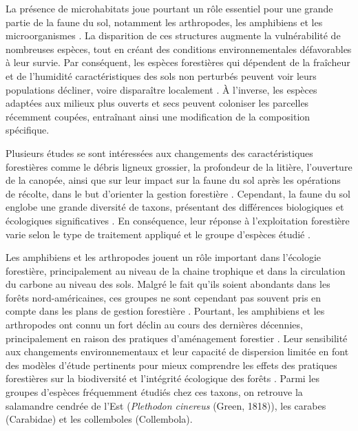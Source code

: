 La présence de microhabitats joue pourtant un rôle essentiel pour une grande partie de la faune du sol, notamment les arthropodes, les amphibiens et les microorganismes \citep{Paillet2010Biodiversitydifferences,Fedrowitz2014Canretention,Chaudhary2016Impactforest}. 
La disparition de ces structures augmente la vulnérabilité de nombreuses espèces, tout en créant des conditions environnementales défavorables à leur survie. 
Par conséquent, les espèces forestières qui dépendent de la fraîcheur et de l'humidité caractéristiques des sols non perturbés peuvent voir leurs populations décliner, voire disparaître localement \citep{Kudrin2023metaanalysiseffects}. 
À l'inverse, les espèces adaptées aux milieux plus ouverts et secs peuvent coloniser les parcelles récemment coupées, entraînant ainsi une modification de la composition spécifique. 

Plusieurs études se sont intéressées aux changements des caractéristiques forestières comme le débris ligneux grossier, la profondeur de la litière, l'ouverture de la canopée, 
ainsi que sur leur impact sur la faune du sol après les opérations de récolte, dans le but d'orienter la gestion forestière \citep{Semlitsch2002CriticalElements,McKenny2006Effectsstructural}. 
Cependant, la faune du sol englobe une grande diversité de taxons, présentant des différences biologiques et écologiques significatives \citep{Kudrin2023metaanalysiseffects}. 
En conséquence, leur réponse à l'exploitation forestière varie selon le type de traitement appliqué et le groupe d'espèces étudié \citep{Malmstrom2009Dynamicssoil,Paillet2010Biodiversitydifferences}. 

Les amphibiens et les arthropodes jouent un rôle important dans l'écologie forestière, principalement au niveau de la chaine trophique et dans la circulation du carbone au niveau des sols. 
Malgré le fait qu'ils soient abondants dans les forêts nord-américaines, ces groupes ne sont cependant pas souvent pris en compte dans les plans de gestion forestière \citep{deMaynadier1995relationshipforest}. 
Pourtant, les amphibiens et les arthropodes ont connu un fort déclin au cours des dernières décennies, principalement en raison des pratiques d'aménagement forestier \citep{Houlahan2000Quantitativeevidence,Stuart2004Statustrends,Wagner2021Insectdecline}. 
Leur sensibilité aux changements environnementaux et leur capacité de dispersion limitée en font des modèles d'étude pertinents pour mieux comprendre les effets des pratiques forestières 
sur la biodiversité et l'intégrité écologique des forêts \citep{pongeVerticalDistributionCollembola2000,Ojala2001Dispersalmicroarthropods,birdChangesSoilLitter2004,Maleque2009Arthropodsbioindicators}. 
Parmi les groupes d'espèces fréquemment étudiés chez ces taxons, on retrouve la salamandre cendrée de l'Est (\textit{Plethodon cinereus} (Green, 1818)), les carabes (Carabidae) et les collemboles (Collembola). 

